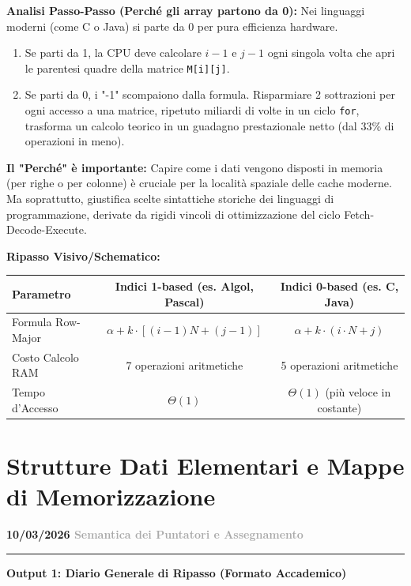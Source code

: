 \documentclass[a4paper, 11pt]{report}
\newcommand{\lezione}[2]{
\vspace{2em}
\noindent\textbf{\Large #1 \hfill \textcolor{darkgray}{#2}}
\vspace{0.5em}
\hrule
\vspace{1.5em}
}
\begin{document}
\textbf{Analisi Passo-Passo (Perché gli array partono da 0):} 
Nei linguaggi moderni (come C o Java) si parte da 0 per pura efficienza hardware.
\begin{enumerate}
    \item Se parti da 1, la CPU deve calcolare $i-1$ e $j-1$ ogni singola volta che apri le parentesi quadre della matrice \texttt{M[i][j]}.
    \item Se parti da 0, i "-1" scompaiono dalla formula. Risparmiare 2 sottrazioni per ogni accesso a una matrice, ripetuto miliardi di volte in un ciclo \texttt{for}, trasforma un calcolo teorico in un guadagno prestazionale netto (dal 33\% di operazioni in meno).
\end{enumerate}

\textbf{Il "Perché" è importante:} Capire come i dati vengono disposti in memoria (per righe o per colonne) è cruciale per la località spaziale delle cache moderne. Ma soprattutto, giustifica scelte sintattiche storiche dei linguaggi di programmazione, derivate da rigidi vincoli di ottimizzazione del ciclo Fetch-Decode-Execute.

\textbf{Ripasso Visivo/Schematico:}
\begin{center}
    \begin{tabular}{|l|c|c|}
        \hline
        \textbf{Parametro} & \textbf{Indici 1-based (es. Algol, Pascal)} & \textbf{Indici 0-based (es. C, Java)} \\
        \hline
        Formula Row-Major & $\alpha + k \cdot [ (i - 1) N + (j - 1) ]$ & $\alpha + k \cdot (i \cdot N + j)$ \\
        \hline
        Costo Calcolo RAM & 7 operazioni aritmetiche & 5 operazioni aritmetiche \\
        \hline
        Tempo d'Accesso & $\Theta(1)$ & $\Theta(1)$ (più veloce in costante) \\
        \hline
    \end{tabular}
\end{center}
\chapter{Strutture Dati Elementari e Mappe di Memorizzazione}

\lezione{10/03/2026}{Semantica dei Puntatori e Assegnamento}

\vspace{0.5cm}
\textbf{Output 1: Diario Generale di Ripasso (Formato Accademico)}
\end{document}
